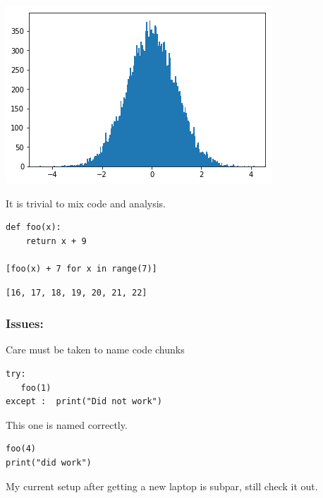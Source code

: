 \documentclass[11pt]{article}
\begin{document}
\begin{center}
\includegraphics[width=.9\linewidth]{./obipy-resources/RDLupI.png}
\end{center}

It is trivial to mix code and analysis.

\begin{verbatim}
def foo(x):
    return x + 9

[foo(x) + 7 for x in range(7)]
\end{verbatim}

\begin{verbatim}
[16, 17, 18, 19, 20, 21, 22]
\end{verbatim}



\subsubsection{Issues:}
\label{sec:org9d98de1}
Care must be taken to name code chunks

\begin{verbatim}
try:
   foo(1)
except :  print("Did not work")
\end{verbatim}



This one is named correctly.

\begin{verbatim}
foo(4)
print("did work")
\end{verbatim}

My current setup after getting a new laptop is subpar, still check it out.
\end{document}
